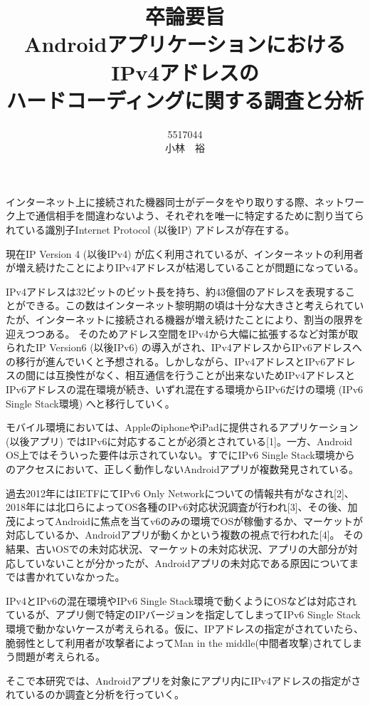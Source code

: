 \documentclass[twocolumn, 10pt, a4paper]{jarticle}
\title{\vspace{-3cm}
{\large 卒論要旨}\\
{\bf
AndroidアプリケーションにおけるIPv4アドレスの\\ハードコーディングに関する調査と分析
}
}
\author{
5517044 \\		%
小林　裕		%
}
\date{}
\begin{document}
\maketitle
\thispagestyle{empty}

インターネット上に接続された機器同士がデータをやり取りする際、ネットワーク上で通信相手を間違わないよう、それぞれを唯一に特定するために割り当てられている識別子Internet Protocol (以後IP) アドレスが存在する。

現在IP Version 4 (以後IPv4) が広く利用されているが、インターネットの利用者が増え続けたことによりIPv4アドレスが枯渇していることが問題になっている。

IPv4アドレスは32ビットのビット長を持ち、約43億個のアドレスを表現することができる。この数はインターネット黎明期の頃は十分な大きさと考えられていたが、インターネットに接続される機器が増え続けたことにより、割当の限界を迎えつつある。
そのためアドレス空間をIPv4から大幅に拡張するなど対策が取られたIP Version6 (以後IPv6) の導入がされ、IPv4アドレスからIPv6アドレスへの移行が進んでいくと予想される。しかしながら、IPv4アドレスとIPv6アドレスの間には互換性がなく、相互通信を行うことが出来ないためIPv4アドレスとIPv6アドレスの混在環境が続き、いずれ混在する環境からIPv6だけの環境 (IPv6 Single Stack環境) へと移行していく。

モバイル環境においては、AppleのiphoneやiPadに提供されるアプリケーション (以後アプリ) ではIPv6に対応することが必須とされている[1]。一方、Android OS上ではそういった要件は示されていない。すでにIPv6 Single Stack環境からのアクセスにおいて、正しく動作しないAndroidアプリが複数発見されている。

過去2012年にはIETFにてIPv6 Only Networkについての情報共有がなされ[2]、2018年には北口らによってOS各種のIPv6対応状況調査が行われ[3]、その後、加茂によってAndroidに焦点を当てv6のみの環境でOSが稼働するか、マーケットが対応しているか、Androidアプリが動くかという複数の視点で行われた[4]。
その結果、古いOSでの未対応状況、マーケットの未対応状況、アプリの大部分が対応していないことが分かったが、Androidアプリの未対応である原因についてまでは書かれていなかった。

IPv4とIPv6の混在環境やIPv6 Single Stack環境で動くようにOSなどは対応されているが、アプリ側で特定のIPバージョンを指定してしまってIPv6 Single Stack環境で動かないケースが考えられる。仮に、IPアドレスの指定がされていたら、脆弱性として利用者が攻撃者によってMan in the middle(中間者攻撃)されてしまう問題が考えられる。

そこで本研究では、Androidアプリを対象にアプリ内にIPv4アドレスの指定がされているのか調査と分析を行っていく。
\end{document}
